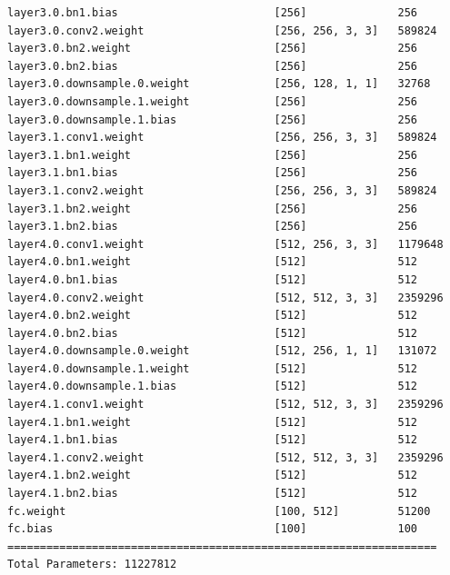 \documentclass[notitlepage,cs4size,punct,oneside]{ctexrep}
\numberwithin{equation}{chapter}
\theoremstyle{mystyle}
\begin{document}
\begin{appendices}
{\begin{lstlisting}[style=output]
layer3.0.bn1.bias                        [256]              256
layer3.0.conv2.weight                    [256, 256, 3, 3]   589824
layer3.0.bn2.weight                      [256]              256
layer3.0.bn2.bias                        [256]              256
layer3.0.downsample.0.weight             [256, 128, 1, 1]   32768
layer3.0.downsample.1.weight             [256]              256
layer3.0.downsample.1.bias               [256]              256
layer3.1.conv1.weight                    [256, 256, 3, 3]   589824
layer3.1.bn1.weight                      [256]              256
layer3.1.bn1.bias                        [256]              256
layer3.1.conv2.weight                    [256, 256, 3, 3]   589824
layer3.1.bn2.weight                      [256]              256
layer3.1.bn2.bias                        [256]              256
layer4.0.conv1.weight                    [512, 256, 3, 3]   1179648
layer4.0.bn1.weight                      [512]              512
layer4.0.bn1.bias                        [512]              512
layer4.0.conv2.weight                    [512, 512, 3, 3]   2359296
layer4.0.bn2.weight                      [512]              512
layer4.0.bn2.bias                        [512]              512
layer4.0.downsample.0.weight             [512, 256, 1, 1]   131072
layer4.0.downsample.1.weight             [512]              512
layer4.0.downsample.1.bias               [512]              512
layer4.1.conv1.weight                    [512, 512, 3, 3]   2359296
layer4.1.bn1.weight                      [512]              512
layer4.1.bn1.bias                        [512]              512
layer4.1.conv2.weight                    [512, 512, 3, 3]   2359296
layer4.1.bn2.weight                      [512]              512
layer4.1.bn2.bias                        [512]              512
fc.weight                                [100, 512]         51200
fc.bias                                  [100]              100
==================================================================
Total Parameters: 11227812


\end{lstlisting}}
\end{appendices}
\end{document}
